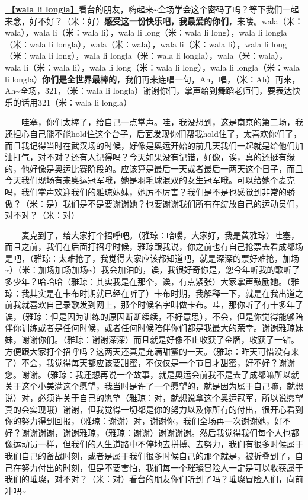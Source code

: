 \documentclass[]{ctexbook}
\begin{document}
\hyperref[wala-li-longla]{🎵【\textbf{wala li longla}】}看台的朋友，嗨起来\textasciitilde 全场学会这个密码了吗？等下我们一起来念，好不好？（米：好）\textbf{感受这一份快乐吧，我最爱的你们}，来喽。wala（米：wala），wala li（米：wala li），wala li long（米：wala li long），wala li longla（米：wala li longla），wala（米：wala），wala li（米：wala li），wala li long（米：wala li long），wala li longla（米：wala li longla），wala（米：wala），wala li（米：wala li），wala li long（米：wala li long），wala li longla（米：wala li longla）\textbf{你们是全世界最棒的}，我们再来连唱一句，Ah，唱，（米：Ah）再来，Ah\textasciitilde 全场，321，（米：wala li longla）谢谢你们，掌声给到舞蹈老师们，要表达快乐的话用321（米：wala li longla）

  哇塞，你们太棒了，给自己一点掌声。哇，我没想到，这是南京的第二场，我还担心自己能不能hold住这个台子，后面发现你们帮我hold住了，太喜欢你们了，而且我记得当时在武汉场的时候，好像是奥运开始的前几天我们一起就是给他们加油打气，对不对？还有人记得吗？今天如果没有记错，好像，诶，真的还挺有缘的，他好像是奥运比赛阶段的。应该算是最后一天或者最后一两天这个日子，而且今天我们现场有来奥运冠军哦，她是羽毛球混双的女生冠军哦。可以给她个麦克吗，我们掌声欢迎我们的雅琼妹妹，她厉不厉害？我们是不是也感觉到非常的骄傲？（米：是）我们是不是要谢谢她？也要谢谢我们所有在绽放自己的运动员们，对不对？（米：对）

  麦克到了，给大家打个招呼吧。（雅琼：哈喽，大家好，我是黄雅琼）哇塞，而且之前，我们在后面打招呼时候，雅琼跟我说，你之前也有自己抢票去看成都场是吧，（雅琼：太难抢了，我觉得大家应该都知道吧，就是深深的票好难抢，加场\textasciitilde）（米：加场加场加场\textasciitilde）我会加油的，诶，我很好奇你是，您今年听我的歌听了多少年？哈哈哈（雅琼：其实我是在那个，诶，有点紧张）大家掌声鼓励她。（雅琼：我其实是在卡布时期就已经在听了）卡布时期，我解释一下，就是在我出道之前我就喜欢自己录歌发到网上，那个时候名字叫做卡布。哇，那你听了有十多年了诶，（雅琼：但是因为训练的原因断断续续，不好意思），不会，但是你觉得能够陪伴你训练或者是任何时候，或者任何时候陪伴你们都是我最大的荣幸。谢谢雅琼妹妹，谢谢你们。（雅琼：谢谢深深）而且就是好像不止收获了金牌，收获了一钻。方便跟大家打个招呼吗？这两天还真是充满甜蜜的一天。（雅琼：昨天可惜没有来了）不会，我觉得每天都应该要甜蜜，不仅仅是一个节日才甜蜜，好不好？谢谢您。谢谢。（雅琼：我还想再说一个故事，就是奥运会前我不是去了成都嘛所以就关于这个小美满这个愿望，我当时是许了一个愿望的，就是因为属于自己嘛，就想说）对，必须许关于自己的愿望（雅琼：对，就想说拿这个奥运冠军，所以说愿望真的会实现哦）谢谢，但我觉得一切都是你的努力以及你所有的付出，很开心看到你的努力得到回报，（雅琼：谢谢）对，谢谢你，我们全场再一次谢谢她，好不好？谢谢谢谢，谢谢雅琼，（雅琼：谢谢）谢谢谢谢。然后我觉得我们每个人也都像运动员一样，但我们的人生道路中不停地去拼搏、去努力，我们有很多时候属于我们自己的备战时刻，或者是属于我们很多时候自己的那个就是，被折叠到了，自己在努力付出的时刻，但是不要害怕，我们每一个璀璨冒险人一定是可以收获属于我们的璀璨，对不对？（米：对）看台的朋友你们听到了吗？璀璨冒险人们，向前冲吧\textasciitilde{}
\end{document}
